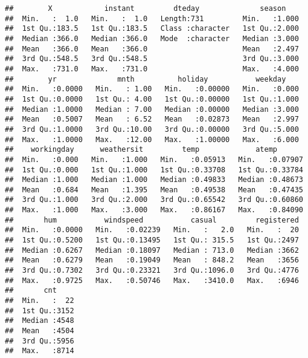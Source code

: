 \documentclass[
]{article}
\begin{document}
\begin{verbatim}
##        X            instant         dteday              season     
##  Min.   :  1.0   Min.   :  1.0   Length:731         Min.   :1.000  
##  1st Qu.:183.5   1st Qu.:183.5   Class :character   1st Qu.:2.000  
##  Median :366.0   Median :366.0   Mode  :character   Median :3.000  
##  Mean   :366.0   Mean   :366.0                      Mean   :2.497  
##  3rd Qu.:548.5   3rd Qu.:548.5                      3rd Qu.:3.000  
##  Max.   :731.0   Max.   :731.0                      Max.   :4.000  
##        yr              mnth          holiday           weekday     
##  Min.   :0.0000   Min.   : 1.00   Min.   :0.00000   Min.   :0.000  
##  1st Qu.:0.0000   1st Qu.: 4.00   1st Qu.:0.00000   1st Qu.:1.000  
##  Median :1.0000   Median : 7.00   Median :0.00000   Median :3.000  
##  Mean   :0.5007   Mean   : 6.52   Mean   :0.02873   Mean   :2.997  
##  3rd Qu.:1.0000   3rd Qu.:10.00   3rd Qu.:0.00000   3rd Qu.:5.000  
##  Max.   :1.0000   Max.   :12.00   Max.   :1.00000   Max.   :6.000  
##    workingday      weathersit         temp             atemp        
##  Min.   :0.000   Min.   :1.000   Min.   :0.05913   Min.   :0.07907  
##  1st Qu.:0.000   1st Qu.:1.000   1st Qu.:0.33708   1st Qu.:0.33784  
##  Median :1.000   Median :1.000   Median :0.49833   Median :0.48673  
##  Mean   :0.684   Mean   :1.395   Mean   :0.49538   Mean   :0.47435  
##  3rd Qu.:1.000   3rd Qu.:2.000   3rd Qu.:0.65542   3rd Qu.:0.60860  
##  Max.   :1.000   Max.   :3.000   Max.   :0.86167   Max.   :0.84090  
##       hum           windspeed           casual         registered  
##  Min.   :0.0000   Min.   :0.02239   Min.   :   2.0   Min.   :  20  
##  1st Qu.:0.5200   1st Qu.:0.13495   1st Qu.: 315.5   1st Qu.:2497  
##  Median :0.6267   Median :0.18097   Median : 713.0   Median :3662  
##  Mean   :0.6279   Mean   :0.19049   Mean   : 848.2   Mean   :3656  
##  3rd Qu.:0.7302   3rd Qu.:0.23321   3rd Qu.:1096.0   3rd Qu.:4776  
##  Max.   :0.9725   Max.   :0.50746   Max.   :3410.0   Max.   :6946  
##       cnt      
##  Min.   :  22  
##  1st Qu.:3152  
##  Median :4548  
##  Mean   :4504  
##  3rd Qu.:5956  
##  Max.   :8714
\end{verbatim}
\end{document}
